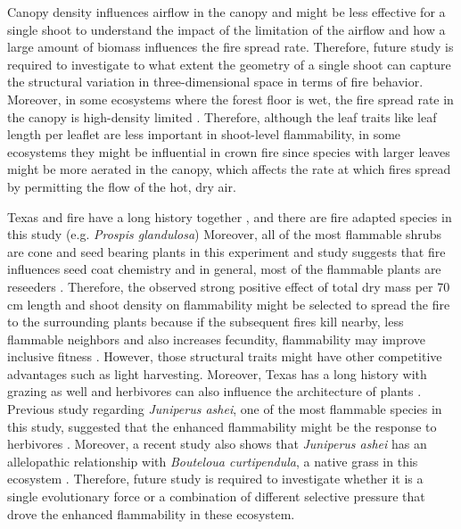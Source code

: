\documentclass[12pt]{report}
\begin{document}
Canopy density influences airflow in the canopy \citep{cionco1978analysis} and might be less effective for a single shoot to understand the impact of the limitation of the airflow and how a large amount of biomass influences the fire spread rate. %
Therefore, future study is required to investigate to what extent the geometry of a single shoot can capture the structural variation in three-dimensional space in terms of fire behavior. Moreover, in some ecosystems where the forest floor is wet, the fire spread rate in the canopy is high-density limited  \citep{ray2005micrometeorological}. Therefore, although the leaf traits like leaf length per leaflet are less important in shoot-level flammability, in some ecosystems they might be influential in crown fire since species with larger leaves might be more aerated in the canopy, which affects the rate at which fires spread by permitting the flow of the hot, dry air. 


Texas and fire have a long history together \citep{moir1982firehistory, stambaugh2011firehistory,stambaugh2014historicalfirehistory,smeins2005historyoffire1}, and there are fire adapted species in this study (e.g. \emph{Prospis glandulosa}) \citep{glandulosahoney,wright1976effect} %
Moreover, all of the most flammable shrubs are cone and seed bearing plants in this experiment 
and study suggests that fire influences seed coat chemistry \citep{mcinnes2022doesseedcoatchemistry} and in general, most of the flammable plants are reseeders \citep{midgley2011pushingreseeders}. Therefore,  the observed strong positive effect of total dry mass per 70\,cm length and shoot density on flammability might be selected to spread the fire to the surrounding plants because if the subsequent fires kill nearby, less flammable neighbors and also increases fecundity, flammability may improve inclusive fitness \citep{bond1995kill}. However, those structural traits might have other competitive advantages such as light harvesting. Moreover, Texas has a long history with grazing as well and herbivores can also influence the architecture of plants \citep{danell1994browseeffects}. Previous study regarding \emph{Juniperus ashei}, one of the most flammable species in this study, suggested that the enhanced flammability might be the response to herbivores \citep{owens1998seasonal}. Moreover, a recent study also shows that \emph{Juniperus ashei} has an allelopathic relationship with \emph{Bouteloua curtipendula}, a native grass in this ecosystem \citep{young2009assessmentallelopathy}. Therefore, future study is required to investigate whether it is a single evolutionary force or a combination of different selective pressure that drove the enhanced flammability in these ecosystem.
\end{document}
